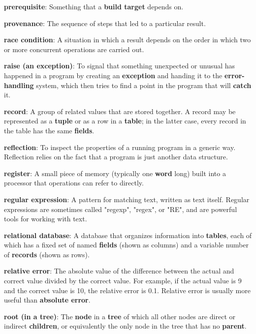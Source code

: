\documentclass{scrbook}
\newcommand{\glosskey}[1]{\textbf{#1}}
\begin{document}
\noindent \textbf{\glosskey{prerequisite}}: 
Something that a \glosskey{build target} depends on.


\noindent \textbf{\glosskey{provenance}}: 
The sequence of steps that led to a particular result.


\noindent \textbf{\glosskey{race condition}}: 
A situation in which a result depends on the order in which two or more concurrent operations are carried out.


\noindent \textbf{\glosskey{raise (an exception)}}: 
To signal that something unexpected or unusual has happened in a program by creating an \glosskey{exception} and handing it to the \glosskey{error-handling} system, which then tries to find a point in the program that will \glosskey{catch} it.


\noindent \textbf{\glosskey{record}}: 
A group of related values that are stored together. A record may be represented as a \glosskey{tuple} or as a row in a \glosskey{table}; in the latter case, every record in the table has the same \glosskey{fields}.


\noindent \textbf{\glosskey{reflection}}: 
To inspect the properties of a running program in a generic way. Reflection relies on the fact that a program is just another data structure.


\noindent \textbf{\glosskey{register}}: 
A small piece of memory (typically one \glosskey{word} long) built into a processor that operations can refer to directly.


\noindent \textbf{\glosskey{regular expression}}: 
A pattern for matching text, written as text itself. Regular expressions are sometimes called "regexp", "regex", or "RE", and are powerful tools for working with text.


\noindent \textbf{\glosskey{relational database}}: 
A database that organizes information into \glosskey{tables}, each of which has a fixed set of named \glosskey{fields} (shown as columns) and a variable number of \glosskey{records} (shown as rows).


\noindent \textbf{\glosskey{relative error}}: 
The absolute value of the difference between the actual and correct value divided by the correct value. For example, if the actual value is 9 and the correct value is 10, the relative error is 0.1. Relative error is usually more useful than \glosskey{absolute error}.


\noindent \textbf{\glosskey{root (in a tree)}}: 
The \glosskey{node} in a \glosskey{tree} of which all other nodes are direct or indirect \glosskey{children}, or equivalently the only node in the tree that has no \glosskey{parent}.
\end{document}
